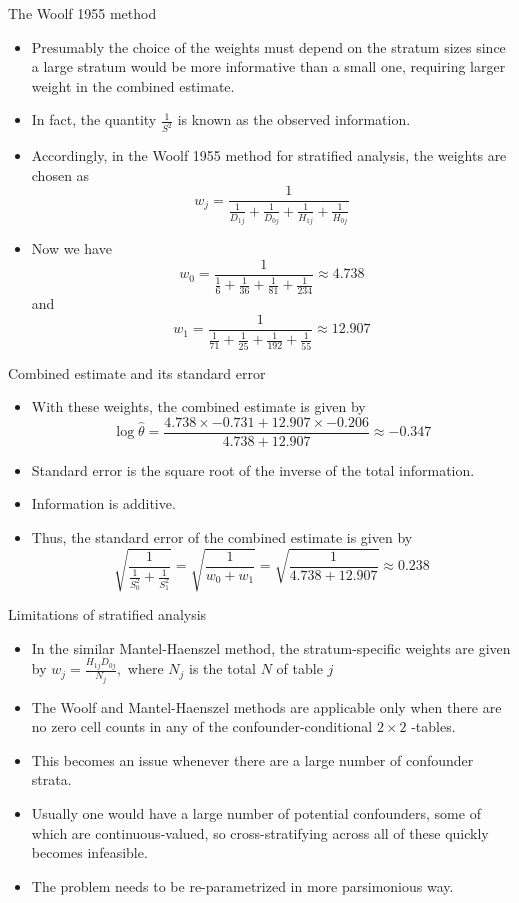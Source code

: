\documentclass[10pt]{beamer}\usepackage[]{graphicx}\usepackage[]{color}
\begin{document}
\begin{frame}{The Woolf 1955 method}
	\begin{itemize}
		\item Presumably the choice of the weights must depend on the stratum sizes since a large stratum would be more informative than a small one, requiring larger weight in the combined estimate. 
		\item In fact, the quantity $\frac{1}{S^{2}}$ is known as the observed information.
		\item Accordingly, in the Woolf 1955 method for stratified analysis, the weights are chosen as
		$$
		w_{j}=\frac{1}{\frac{1}{D_{1 j}}+\frac{1}{D_{0 j}}+\frac{1}{H_{1 j}}+\frac{1}{H_{0 j}}}
		$$
		\item Now we have
		$$
		w_{0}=\frac{1}{\frac{1}{6}+\frac{1}{36}+\frac{1}{81}+\frac{1}{234}} \approx 4.738
		$$
		and
		$$
		w_{1}=\frac{1}{\frac{1}{71}+\frac{1}{25}+\frac{1}{192}+\frac{1}{55}} \approx 12.907
		$$
	\end{itemize}
\end{frame}




\begin{frame}{Combined estimate and its standard error}
	\begin{itemize}
		\item With these weights, the combined estimate is given by
		$$
		\log \hat{\theta}=\frac{4.738 \times-0.731+12.907 \times-0.206}{4.738+12.907} \approx-0.347
		$$
		\item Standard error is the square root of the inverse of the total information.
		\item  Information is additive.
		\item  Thus, the standard error of the combined estimate is given by
		$$
		\sqrt{\frac{1}{\frac{1}{S_{0}^{2}}+\frac{1}{S_{1}^{2}}}}=\sqrt{\frac{1}{w_{0}+w_{1}}}=\sqrt{\frac{1}{4.738+12.907}} \approx 0.238
		$$
	\end{itemize}
\end{frame}



\begin{frame}{Limitations of stratified analysis}
	\begin{itemize}
		\item In the similar Mantel-Haenszel method, the stratum-specific weights are given by $w_{j}=\frac{H_{1 j} D_{0 j}}{N_{j}},$ where $N_{j}$ is the total $N$ of table $j$
		\item  The Woolf and Mantel-Haenszel methods are applicable only when there are no zero cell counts in any of the confounder-conditional $2 \times 2$ -tables.
		\item  This becomes an issue whenever there are a large number of confounder strata.
		\item  Usually one would have a large number of potential confounders, some of which are continuous-valued, so cross-stratifying across all of these quickly becomes infeasible.
		\item  The problem needs to be re-parametrized in more parsimonious way.
	\end{itemize}
\end{frame}
\end{document}
